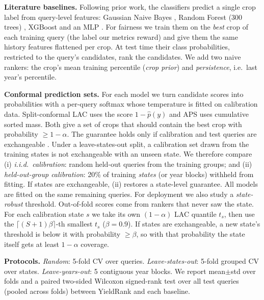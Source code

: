 \documentclass[conference]{IEEEtran}
\begin{document}
\textbf{Literature baselines.} Following prior work, the classifiers predict a single crop label
from query-level features: Gaussian Naive Bayes \cite{pudumalar2017,elbasi2023}, Random Forest
(300 trees) \cite{kulkarni2018,breiman2001}, XGBoost \cite{dey2024,chen2016} and an MLP
\cite{musanase2023}. For fairness we train them on the \emph{best} crop of each training query
(the label our metrics reward) and give them the same history features flattened per crop. At
test time their class probabilities, restricted to the query's candidates, rank the candidates.
We add two naive rankers: the crop's mean training percentile (\emph{crop prior}) and
\emph{persistence}, i.e.\ last year's percentile.

\textbf{Conformal prediction sets.} For each model we turn candidate scores into probabilities
with a per-query softmax whose temperature is fitted on calibration data. Split-conformal LAC
\cite{sadinle2019} uses the score $1-\hat p(y)$ and APS \cite{romano2020} uses cumulative
sorted mass. Both give a set of crops that should contain the best crop with probability
$\ge 1-\alpha$. The guarantee holds only if calibration and test queries are exchangeable
\cite{angelopoulos2021}. Under a leave-states-out split, a calibration set drawn from the
training states is not exchangeable with an unseen state. We therefore compare
(i) \emph{i.i.d.\ calibration}: random held-out queries from the training groups; and
(ii) \emph{held-out-group calibration}: 20\% of training \emph{states} (or year blocks) withheld
from fitting. If states are exchangeable, (ii) restores a state-level guarantee. All models are
fitted on the same remaining queries. For deployment we also study a \emph{state-robust}
threshold. Out-of-fold scores come from rankers that never saw the state. For each calibration
state $s$ we take its own $(1-\alpha)$ LAC quantile $t_s$, then use the
$\lceil (S+1)\beta\rceil$-th smallest $t_s$ ($\beta=0.9$). If states are exchangeable, a new
state's threshold is below it with probability $\ge\beta$, so with that probability the state
itself gets at least $1-\alpha$ coverage.

\textbf{Protocols.} \emph{Random}: 5-fold CV over queries. \emph{Leave-states-out}: 5-fold
grouped CV over states. \emph{Leave-years-out}: 5 contiguous year blocks. We report mean$\pm$std
over folds and a paired two-sided Wilcoxon signed-rank test over all test queries (pooled across
folds) between YieldRank and each baseline.

\end{document}
